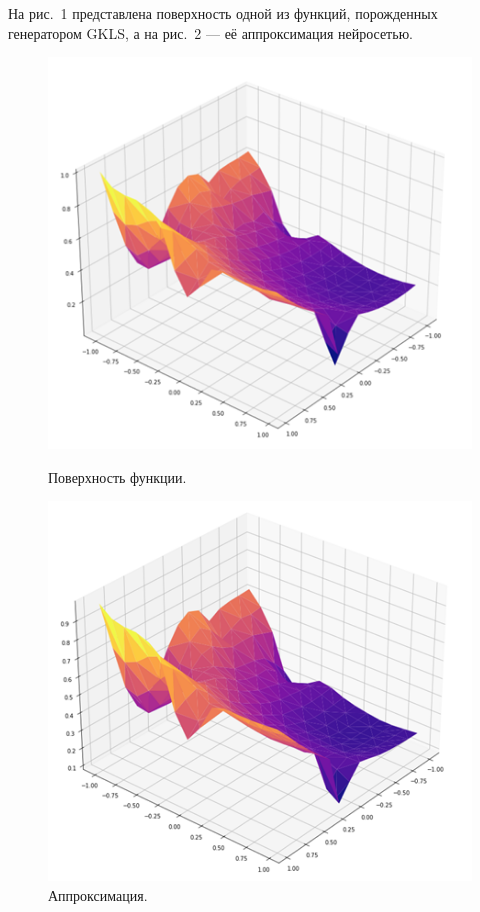 \documentclass[11pt, oneside, a4paper]{article}
\begin{document}
На рис.~1 представлена поверхность одной из функций, порожденных генератором GKLS, а на рис.~2 --- её аппроксимация нейросетью.
\begin{figure}[!h]
	\begin{center}
		\begin{minipage}[h]{0.45\linewidth}
			\includegraphics[width=1\linewidth]{figure/1.png}
			\caption{Поверхность функции.} %
		\end{minipage}
		\hfill
		\begin{minipage}[!h]{0.45\linewidth}
			\includegraphics[width=1\linewidth]{figure/1_approx.png}
			\caption{Аппроксимация.}
		\end{minipage}
	\end{center}
\end{figure}	
\end{document}
